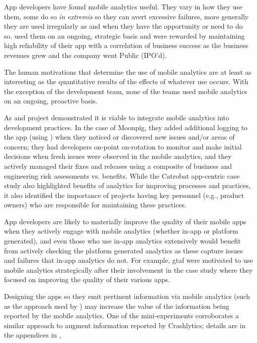  App developers have found mobile analytics useful. They vary in how they use them, some do so \emph{in extremis} so they can avert excessive failures, more generally they are used irregularly as and when they have the opportunity or need to do so.  used them on an ongoing, strategic basis and were rewarded by maintaining high reliability of their app with a correlation of business success as the business revenues grew and the company went Public (IPO'd). 

The human motivations that determine the use of mobile analytics are at least as interesting as the quantitative results of the effects of whatever use occurs. With the exception of the  development team, none of the teams used mobile analytics on an ongoing, proactive basis. 

As  and  project demonstrated it is viable to integrate mobile analytics into development practices. In the case of Moonpig, they added additional logging to the app (using ) when they noticed or discovered new issues and/or areas of concern; they had developers on-point on-rotation to monitor and make initial decisions when fresh issues were observed in the mobile analytics, and they actively managed their fixes and releases using a composite of business and engineering risk assessments vs. benefits. While the Catrobat app-centric case study also highlighted benefits of analytics for improving processes and practices, it also identified the importance of projects having key personnel (e.g., product owners) who are responsible for maintaining these practices.

App developers are likely to materially improve the quality of their mobile apps when they actively engage with mobile analytics (whether in-app or platform generated), and even those who use in-app analytics extensively would benefit from actively checking the platform generated analytics as these capture issues and failures that in-app analytics do not. For example, \Gls{gtaf} were motivated to use mobile analytics strategically after their involvement in the case study where they focused on improving the quality of their various apps. 

Designing the apps so they emit pertinent information via mobile analytics (such as the approach used by ) may increase the value of the information being reported by the mobile analytics. One of the mini-experiments corroborates a  similar approach to augment information reported by Crashlytics; details are in the appendices in , 


